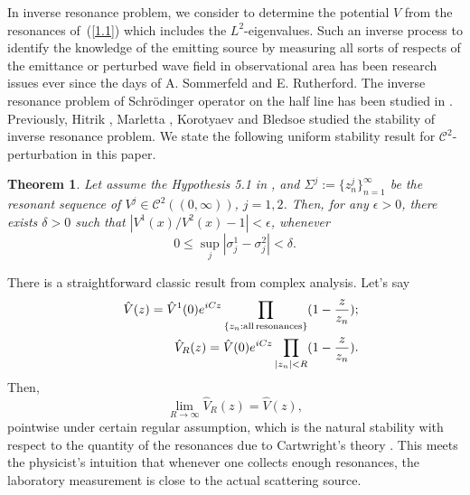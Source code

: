 \documentclass[10pt,a4paper]{article}
\theoremstyle{plain}
\newtheorem{theorem}{Theorem}[section]
\theoremstyle{definition}
\theoremstyle{remark}
\numberwithin{equation}{section}
\begin{document}
In inverse resonance problem, we consider to determine the potential $V$ from the resonances of~(\ref{1.1}) which includes the $L^{2}$-eigenvalues. Such an inverse process to identify the knowledge of  the emitting source by measuring all sorts of respects of the emittance or perturbed wave field in observational area has been research issues ever since the days of A. Sommerfeld and E. Rutherford. The inverse resonance problem of Schr\"{o}dinger operator on the half line has been studied in \cite{Dyatlov,Korotyaev2,Marletta}. Previously, Hitrik \cite{Hitrik}, Marletta \cite{Marletta}, Korotyaev \cite{Korotyaev2} and Bledsoe \cite{Beldsoe} studied the stability of inverse resonance problem. 
We state the following uniform stability result for $\mathcal{C}^{2}$-perturbation in this paper.
\begin{theorem}\label{11}
Let assume the Hypothesis 5.1 in \cite[p.\,261]{Froese},
and $\Sigma^{j}:=\{z_{n}^{j}\}_{n=1}^{\infty}$ be the resonant sequence of $V^{j}\in\mathcal{C}^{2}((0,\infty))$, $j=1,2$. Then, for any $\epsilon>0$,  there exists $\delta>0$ such that $|V^{1}(x)/V^{2}(x)-1|<\epsilon$, whenever $$0\leq\sup_{j}|\sigma_{j}^{1}-\sigma_{j}^{2}|<\delta.$$
\end{theorem}
There is a straightforward classic result from complex analysis. Let's say
\begin{eqnarray}
&&\hat{V}(z)=\hat{V}^{1}(0)e^{iCz}\prod_{\{z_{n}:{\rm all\, resonances}\}}(1-\frac{z}{z_{n}});\\
&&\hat{V}_{R}(z)=\hat{V}(0)e^{iCz}\prod_{|z_{n}|<R}(1-\frac{z}{z_{n}}).
\end{eqnarray}
Then, $$\lim_{R\rightarrow\infty}\hat{V}_{R}(z)=\hat{V}(z),$$ pointwise under certain regular assumption,
which is the natural stability with respect to the quantity of the resonances due to Cartwright's theory \cite[p.\,251]{Levin}. This meets the physicist's intuition that whenever one collects enough resonances, the laboratory measurement is close to the actual scattering source.
\end{document}
